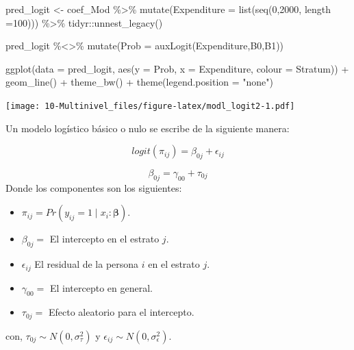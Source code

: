 \documentclass[
  12pt,
]{book}
\newenvironment{Shaded}{\begin{snugshade}}{\end{snugshade}}
\newcommand{\AttributeTok}[1]{\textcolor[rgb]{0.77,0.63,0.00}{#1}}
\newcommand{\DecValTok}[1]{\textcolor[rgb]{0.00,0.00,0.81}{#1}}
\newcommand{\FunctionTok}[1]{\textcolor[rgb]{0.00,0.00,0.00}{#1}}
\newcommand{\NormalTok}[1]{#1}
\newcommand{\OtherTok}[1]{\textcolor[rgb]{0.56,0.35,0.01}{#1}}
\newcommand{\SpecialCharTok}[1]{\textcolor[rgb]{0.00,0.00,0.00}{#1}}
\newcommand{\StringTok}[1]{\textcolor[rgb]{0.31,0.60,0.02}{#1}}
\providecommand{\tightlist}{%
  \setlength{\itemsep}{0pt}\setlength{\parskip}{0pt}}
\begin{document}
\begin{Shaded}
\begin{Highlighting}[]
\NormalTok{pred\_logit }\OtherTok{\textless{}{-}}\NormalTok{ coef\_Mod }\SpecialCharTok{\%\textgreater{}\%} \FunctionTok{mutate}\NormalTok{(}\AttributeTok{Expenditure =} \FunctionTok{list}\NormalTok{(}\FunctionTok{seq}\NormalTok{(}\DecValTok{0}\NormalTok{,}\DecValTok{2000}\NormalTok{, }\AttributeTok{length =}\DecValTok{100}\NormalTok{))) }\SpecialCharTok{\%\textgreater{}\%} 
\NormalTok{    tidyr}\SpecialCharTok{::}\FunctionTok{unnest\_legacy}\NormalTok{()}

\NormalTok{pred\_logit }\SpecialCharTok{\%\textless{}\textgreater{}\%} \FunctionTok{mutate}\NormalTok{(}\AttributeTok{Prob =} \FunctionTok{auxLogit}\NormalTok{(Expenditure,B0,B1)) }
  
\FunctionTok{ggplot}\NormalTok{(}\AttributeTok{data =}\NormalTok{ pred\_logit, }\FunctionTok{aes}\NormalTok{(}\AttributeTok{y =}\NormalTok{ Prob, }\AttributeTok{x =}\NormalTok{ Expenditure, }\AttributeTok{colour =}\NormalTok{ Stratum)) }\SpecialCharTok{+} 
  \FunctionTok{geom\_line}\NormalTok{() }\SpecialCharTok{+} \FunctionTok{theme\_bw}\NormalTok{() }\SpecialCharTok{+} \FunctionTok{theme}\NormalTok{(}\AttributeTok{legend.position =} \StringTok{"none"}\NormalTok{)}
\end{Highlighting}
\end{Shaded}

\texttt{[image: 10-Multinivel\_files/figure-latex/modl\_logit2-1.pdf]}

Un modelo logístico básico o nulo se escribe de la siguiente manera:

\[
logit( \pi_{ij})=\beta_{0j}+\epsilon_{ij}
\]

\[
\beta_{0j}=\gamma_{00}+\tau_{0j}
\]
Donde los componentes son los siguientes:

\begin{itemize}
\tightlist
\item
  \(\pi_{ij}=Pr\left(y_{ij}=1\mid x_{i}:\boldsymbol{\beta}\right)\).
\item
  \(\beta_{0j}=\) El intercepto en el estrato \(j\).
\item
  \(\epsilon_{ij}\) El residual de la persona \(i\) en el estrato \(j\).
\item
  \(\gamma_{00}=\) El intercepto en general.
\item
  \(\tau_{0j}=\) Efecto aleatorio para el intercepto.
\end{itemize}

con,
\(\tau_{0j}\sim N\left(0,\sigma_{\tau}^{2}\right)\) y \(\epsilon_{ij}\sim N\left(0,\sigma_{\epsilon}^{2}\right)\).
\end{document}
